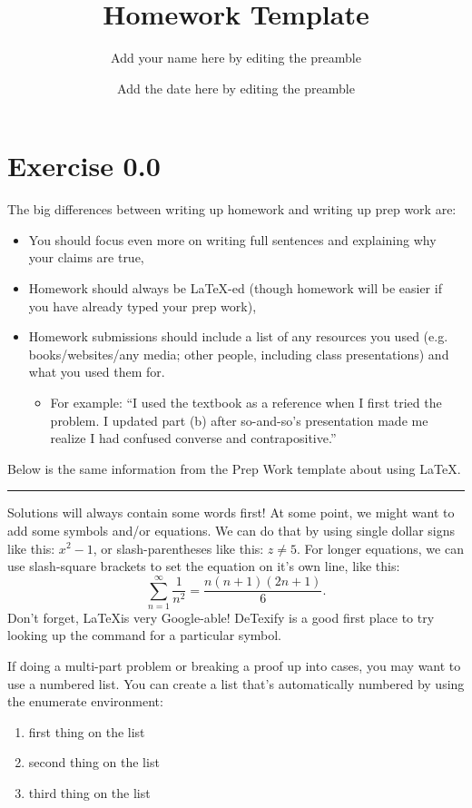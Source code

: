 \documentclass{article}
\title{Homework Template}
\author{Add your name here by editing the preamble}
\date{Add the date here by editing the preamble}
\begin{document}
\maketitle



\section*{Exercise 0.0}  
The big differences between writing up homework and writing up prep work are:
\begin{itemize}
    \item You should focus even more on writing full sentences and explaining why your claims are true,
    \item Homework should always be \LaTeX-ed (though homework will be easier if you have already typed your prep work),
    \item Homework submissions should include a list of any resources you used (e.g. books/websites/any media; other people, including class presentations) and what you used them for.
        \begin{itemize}
            \item For example:  ``I used the textbook as a reference when I first tried the problem. I updated part (b) after so-and-so's presentation made me realize I had confused converse and contrapositive.''
        \end{itemize}
\end{itemize}


Below is the same information from the Prep Work template about using \LaTeX.
\vspace{0.5cm}
\hrule 
\vspace{0.5cm}
Solutions will always contain some words first!  At some point, we might want to add some symbols and/or equations.  We can do that by using single dollar signs like this: $x^2 - 1$, or slash-parentheses like this: \(z \neq 5\).  For longer equations, we can use slash-square brackets to set the equation on it's own line, like this:
\[ \sum_{n=1}^\infty \frac{1}{n^2} = \frac{n(n+1)(2n+1)}{6}. \]
Don't forget, \LaTeX is very Google-able!  DeTexify is a good first place to try looking up the command for a particular symbol. 

If doing a multi-part problem or breaking a proof up into cases, you may want to use a numbered list.  You can create a list that's automatically numbered by using the enumerate environment:
\begin{enumerate}
    \item first thing on the list
    \item second thing on the list
    \item third thing on the list
\end{enumerate}
\end{document}
